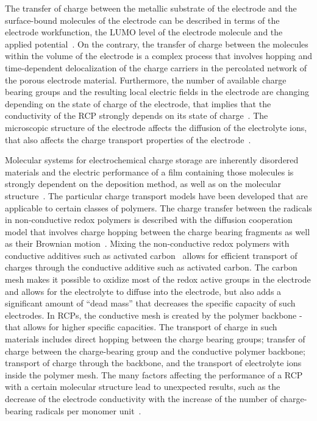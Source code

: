 \par
The transfer of charge between the metallic substrate of the electrode and the surface-bound molecules of the electrode can be described in terms of the electrode workfunction, the LUMO level of the electrode molecule and the applied potential~\cite{Bard_book}. 
On the contrary, the transfer of charge between the molecules within the volume of the electrode is a complex process that involves hopping and time-dependent delocalization of the charge carriers in the percolated network of the porous electrode material. Furthermore, the number of available charge bearing groups and the resulting local electric fields in the electrode are changing depending on the state of charge of the electrode, that implies that the conductivity of the RCP strongly depends on its state of charge~\cite{Zhang2018}.
The microscopic structure of the electrode affects the diffusion of the electrolyte ions, that also affects the charge transport properties of the electrode~\cite{Koshika_2009,He_2022}.\\ 

\par
Molecular systems for electrochemical charge storage are inherently disordered materials and the electric performance of a film containing those molecules is strongly dependent on the deposition method, as well as on the molecular structure~\cite{Xie2021,Zhang2018}. The particular charge transport models have been developed that are applicable to certain classes of polymers. The charge transfer between the radicals in non-conductive redox polymers is described with the diffusion cooperation model that involves charge hopping between the charge bearing fragments as well as their Brownian motion~\cite{Sato2018}. Mixing the non-conductive redox polymers with conductive additives such as activated carbon~\cite{Vereshchagin2022,Daniel2023_Multimodal} allows for efficient transport of charges through the conductive additive such as activated carbon. The carbon mesh makes it possible to oxidize most of the redox active groups in the electrode and allows for the electrolyte to diffuse into the electrode, but also adds a significant amount of ``dead mass'' that decreases the specific capacity of such electrodes. In RCPs, the conductive  mesh is created by the polymer backbone - that allows for higher specific capacities. The transport of charge in such materials includes direct hopping between the charge bearing groups; transfer of charge between the charge-bearing group and the conductive polymer backbone; transport of charge through the backbone, and the transport of electrolyte ions inside the polymer mesh. The many factors affecting the performance of a RCP with a certain molecular structure lead to unexpected results, such as the decrease of the electrode conductivity with the increase of the number of charge-bearing radicals per monomer unit~\cite{Zhang2018}.


